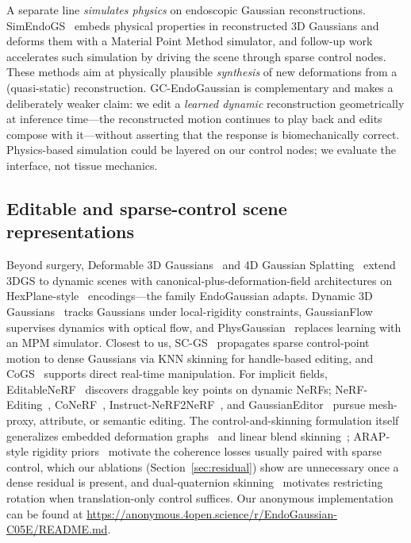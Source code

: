 \documentclass[ASNA,twocolumn]{USG} %
\begin{document}
A separate line \emph{simulates physics} on endoscopic Gaussian reconstructions. SimEndoGS~\cite{yang2024simendogs} embeds physical properties in reconstructed 3D Gaussians and deforms them with a Material Point Method simulator, and follow-up work~\cite{yang2025sparsesim} accelerates such simulation by driving the scene through sparse control nodes. These methods aim at physically plausible \emph{synthesis} of new deformations from a (quasi-static) reconstruction. GC-EndoGaussian is complementary and makes a deliberately weaker claim: we edit a \emph{learned dynamic} reconstruction geometrically at inference time---the reconstructed motion continues to play back and edits compose with it---without asserting that the response is biomechanically correct. Physics-based simulation could be layered on our control nodes; we evaluate the interface, not tissue mechanics.

\subsection{Editable and sparse-control scene representations}

Beyond surgery, Deformable 3D Gaussians~\cite{yang2024deformable3dgaussians} and 4D Gaussian Splatting~\cite{wu2024fourdgs} extend 3DGS to dynamic scenes with canonical-plus-deformation-field architectures on HexPlane-style~\cite{cao2023hexplane} encodings---the family EndoGaussian adapts. Dynamic 3D Gaussians~\cite{luiten2024dynamic3dgaussians} tracks Gaussians under local-rigidity constraints, GaussianFlow~\cite{gao2024gaussianflow} supervises dynamics with optical flow, and PhysGaussian~\cite{xie2024physgaussian} replaces learning with an MPM simulator. Closest to us, SC-GS~\cite{huang2024scgs} propagates sparse control-point motion to dense Gaussians via KNN skinning for handle-based editing, and CoGS~\cite{yu2024cogs} supports direct real-time manipulation. For implicit fields, EditableNeRF~\cite{zheng2023editablenerf} discovers draggable key points on dynamic NeRFs; NeRF-Editing~\cite{yuan2022nerfediting}, CoNeRF~\cite{kania2022conerf}, Instruct-NeRF2NeRF~\cite{haque2023instructnerf2nerf}, and GaussianEditor~\cite{chen2024gaussianeditor} pursue mesh-proxy, attribute, or semantic editing. The control-and-skinning formulation itself generalizes embedded deformation graphs~\cite{sumner2007embedded} and linear blend skinning~\cite{magnenatthalmann1988jld,lewis2000posespace,sumner2004deformationtransfer}; ARAP-style rigidity priors~\cite{sorkine2007arap} motivate the coherence losses usually paired with sparse control, which our ablations (Section~\ref{sec:residual}) show are unnecessary once a dense residual is present, and dual-quaternion skinning~\cite{kavan2007dualquaternion,kavan2008geometricskinning} motivates restricting rotation when translation-only control suffices. Our anonymous implementation can be found at \url{https://anonymous.4open.science/r/EndoGaussian-C05E/README.md}.
\end{document}
